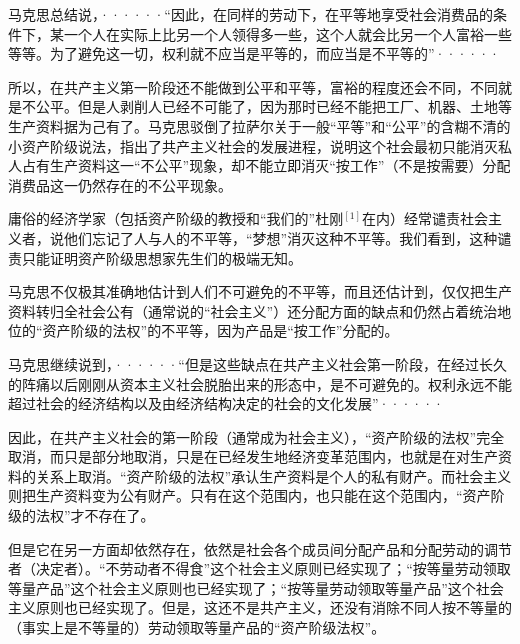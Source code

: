 \pskip
\leftskip=10mm
\small

马克思总结说，······“因此，在同样的劳动下，在平等地享受社会消费品的条件下，某一个人在实际上比另一个人领得多一些，这个人就会比另一个人富裕一些等等。为了避免这一切，权利就不应当是平等的，而应当是不平等的”······

\pskip
\leftskip=0mm
\normalsize

所以，在共产主义第一阶段还不能做到公平和平等，富裕的程度还会不同，不同就是不公平。但是人{\kaishu 剥削}人已经不可能了，因为那时已经不能把工厂、机器、土地等{\kaishu 生产资料}据为己有了。马克思驳倒了拉萨尔关于一般“平等”和“公平”的含糊不清的小资产阶级说法，指出了共产主义社会的{\kaishu 发展进程}，说明这个社会最初{\kaishu 只能}消灭私人占有生产资料这一“不公平”现象，却{\kaishu 不能}立即消灭“按工作”（不是按需要）分配消费品这一仍然存在的不公平现象。

庸俗的经济学家（包括资产阶级的教授和“我们的”杜刚$^{[1]}$在内）经常谴责社会主义者，说他们忘记了人与人的不平等，“梦想”消灭这种不平等。我们看到，这种谴责只能证明资产阶级思想家先生们的极端无知。

马克思不仅极其准确地估计到人们不可避免的不平等，而且还估计到，仅仅把生产资料转归全社会公有（通常说的“社会主义”）还分配方面的缺点和{\kaishu 仍然占着统治地位}的“资产阶级的法权”的不平等，因为产品是“按工作”分配的。

\pskip
\leftskip=10mm
\small

马克思继续说到，······“但是这些缺点在共产主义社会第一阶段，在经过长久的阵痛以后刚刚从资本主义社会脱胎出来的形态中，是不可避免的。权利永远不能超过社会的经济结构以及由经济结构决定的社会的文化发展”······

\pskip
\leftskip=0mm
\normalsize

因此，在共产主义社会的第一阶段（通常成为社会主义），“资产阶级的法权”完全取消，而只是部分地取消，只是在已经发生地经济变革范围内，也就是在对生产资料的关系上取消。“资产阶级的法权”承认生产资料是个人的私有财产。而社会主义则把生产资料变为{\kaishu 公有}财产。{\kaishu 只有在这个范围内}，也只能在这个范围内，“资产阶级的法权”才不存在了。

但是它在另一方面却依然存在，依然是社会各个成员间分配产品和分配劳动的调节者（决定者）。“不劳动者不得食”这个社会主义原则{\kaishu 已经}实现了；“按等量劳动领取等量产品”这个社会主义原则也{\kaishu 已经}实现了；“按等量劳动领取等量产品”这个社会主义原则也{\kaishu 已经}实现了。但是，这还不是共产主义，还没有消除不同人按不等量的（事实上是不等量的）劳动领取等量产品的“资产阶级法权”。

